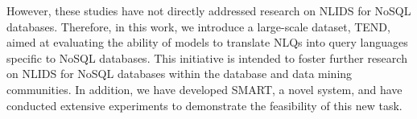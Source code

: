 However, these studies have not directly addressed research on NLIDS for NoSQL databases. Therefore, in this work, we introduce a large-scale dataset, TEND, aimed at evaluating the ability of models to translate NLQs into query languages specific to NoSQL databases. This initiative is intended to foster further research on NLIDS for NoSQL databases within the database and data mining communities. In addition, we have developed SMART, a novel system, and have conducted extensive experiments to demonstrate the feasibility of this new task.